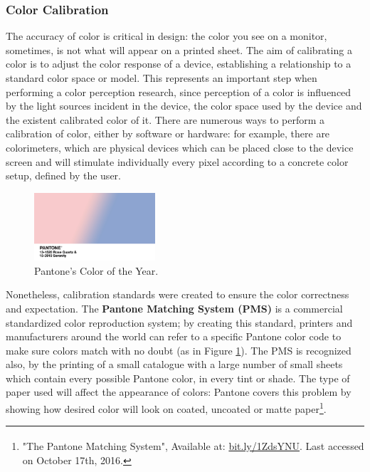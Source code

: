 \subsubsection{Color Calibration}
%
The accuracy of color is critical in design: the color you see on a monitor, sometimes, is not what will appear on a printed sheet. The aim of calibrating a color is to adjust the color response of a device, establishing
a relationship to a standard color space or model. This represents an important step when performing a
color perception research, since perception of a color is influenced by the light sources incident in the
device, the color space used by the device and the existent calibrated color of it. There are numerous
ways to perform a calibration of color, either by software or hardware: for example, there are colorimeters, which
are physical devices which can be placed close to the device screen and will stimulate individually every pixel
according to a concrete color setup, defined by the user. \par
%
\begin{figure}
	\centering
    \vspace{-10pt}
    \includegraphics[width=0.4\textwidth]{images/background/Pantone_rose_serenity.jpg}
    \caption[Pantone Matching System - Marsala]{Pantone's Color of the Year.\protect\footnotemark[18]}
    \label{fig:pantone}
\end{figure}
%
Nonetheless, calibration standards were created to ensure the color correctness and expectation. The
\textbf{Pantone Matching System (PMS)} is a commercial standardized color reproduction system; by creating
this standard, printers and manufacturers around the world can refer to a specific Pantone color code to
make sure colors match with no doubt (as in Figure \ref{fig:pantone}). The PMS is recognized also, by the printing of a small catalogue with
a large number of small sheets which contain every possible Pantone color, in every tint or shade. The type
of paper used will affect the appearance of colors: Pantone covers this problem by showing how desired
color will look on coated, uncoated or matte paper\footnote{"The Pantone Matching System\textsuperscript{\textregistered}",
Available at: \url {bit.ly/1ZdsYNU}. Last accessed on October 17th, 2016.}.
